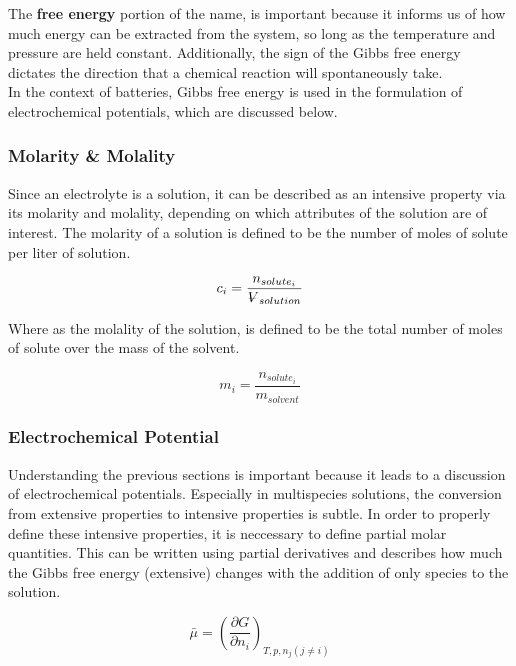 \documentclass[lettersize,journal]{IEEEtran}
\newcommand{\volume}{{\ooalign{\hfil$V$\hfil\cr\kern0.08em--\hfil\cr}}}
\begin{document}
 The \textbf{free energy} portion of the name, is important because it informs us of how much energy can be extracted from the system, so long as the temperature and pressure are held constant. Additionally, the sign of the Gibbs free energy dictates the direction that a chemical reaction will spontaneously take. \\

 In the context of batteries, Gibbs free energy is used in the formulation of electrochemical potentials, which are discussed below.\\


 \subsubsection{Molarity \& Molality}

 Since an electrolyte is a solution, it can be described as an intensive property via its molarity and molality, depending on which attributes of the solution are of interest. The molarity of a solution is defined to be the number of moles of solute per liter of solution.

\begin{equation}\label{molarity}
    c_i = \frac{n_{solute_i}}{{\volume}_{solution}}
\end{equation}


 \noindent Where as the molality of the solution, is defined to be the total number of moles of solute over the mass of the solvent.

 \begin{equation}\label{molality}
     m_i = \frac{n_{solute_i}}{m_{solvent}}
 \end{equation}

 \subsubsection{Electrochemical Potential}

 Understanding the previous sections is important because it leads to a discussion of electrochemical potentials. Especially in multispecies solutions, the conversion from extensive properties to intensive properties is subtle. In order to properly define these intensive properties, it is neccessary to define partial molar quantities. This can be written using partial derivatives and describes how much the Gibbs free energy (extensive) changes with the addition of only species to the solution.

 \begin{equation}\label{electrochemical_potential}
     \bar{\mu} = \left( \frac{\partial G}{\partial n_{i}} \right)_{T,p,n_{j} (j \neq i)}
 \end{equation}
\end{document}
